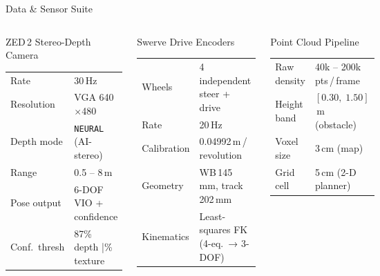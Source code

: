 \documentclass[aspectratio=169, 10pt]{beamer}
\begin{document}
\begin{frame}{Data \& Sensor Suite}
\begin{columns}[T]

  \begin{block}{ZED\,2 Stereo-Depth Camera}
    \small\renewcommand{\arraystretch}{1.1}
    \begin{tabular}{@{}ll@{}}
      Rate          & 30\,Hz \\
      Resolution    & VGA 640$\times$480 \\
      Depth mode    & \texttt{NEURAL} (AI-stereo) \\
      Range         & 0.5 – 8\,m \\
      Pose output   & 6-DOF VIO + confidence\\
      Conf.\ thresh & 87\% depth \;|\; 95\% texture \\
    \end{tabular}
  \end{block}

  \vspace{5pt}
  \begin{block}{Swerve Drive Encoders}
    \small\renewcommand{\arraystretch}{1.1}
    \begin{tabular}{@{}ll@{}}
      Wheels      & 4 independent steer + drive \\
      Rate        & 20\,Hz \\
      Calibration & 0.04992\,m\,/\,revolution \\
      Geometry    & WB\,145\,mm, track\,202\,mm \\
      Kinematics  & Least-squares FK (4-eq.\ → 3-DOF) \\
    \end{tabular}
  \end{block}

  \begin{exampleblock}{Point Cloud Pipeline}
    \small\renewcommand{\arraystretch}{1.1}
    \begin{tabular}{@{}ll@{}}
      Raw density  & 40k – 200k pts\,/\,frame \\
      Height band  & $[0.30,\;1.50]$\,m (obstacle) \\
      Voxel size   & 3\,cm (map) \\
      Grid cell    & 5\,cm (2-D planner) \\
    \end{tabular}
  \end{exampleblock}


\end{columns}
\end{frame}
\end{document}
